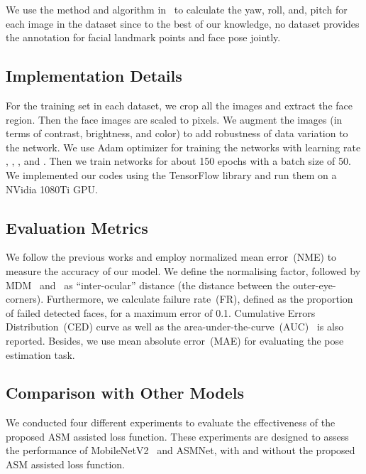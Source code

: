 \documentclass[final]{cvpr}
\begin{document}
We use the method and algorithm in~\cite{Ruiz_2018_CVPR_Workshops} to calculate the yaw, roll, and, pitch for each image in the dataset since to the best of our knowledge, no dataset provides the annotation for facial landmark points and face pose jointly.




\subsection{Implementation Details}
For the training set in each dataset, we crop all the images and extract the face region. Then the face images are scaled to  pixels. We augment the images (in terms of contrast, brightness, and color) to add robustness of data variation to the network. We use Adam optimizer for training the networks with learning rate , , , and . Then we train networks for about 150 epochs with a batch size of 50. We implemented our codes using the TensorFlow library and run them on a NVidia 1080Ti GPU.

\subsection{Evaluation Metrics} \label{sec:vel_metrics}
We follow the previous works and employ normalized mean error~(NME) to measure the accuracy of our model. We define the normalising factor, followed by MDM~\cite{trigeorgis2016mnemonic} and~\cite{sagonas2013300} as “inter-ocular” distance (the distance between the outer-eye-corners). Furthermore, we calculate failure rate~(FR), defined as the proportion of failed detected faces, for a maximum error of 0.1. Cumulative Errors Distribution~(CED) curve as well as the area-under-the-curve~(AUC)~\cite{yang2015empirical} is also reported. Besides, we use mean absolute error~(MAE) for evaluating the pose estimation task.







\subsection{Comparison with Other Models} \label{sec:result_comparison}

We conducted four different experiments to evaluate the effectiveness of the proposed ASM assisted loss function. These experiments are designed to assess the performance of MobileNetV2~\cite{sandler2018mobilenetv2} and ASMNet, with and without the proposed ASM assisted loss function.
\end{document}
